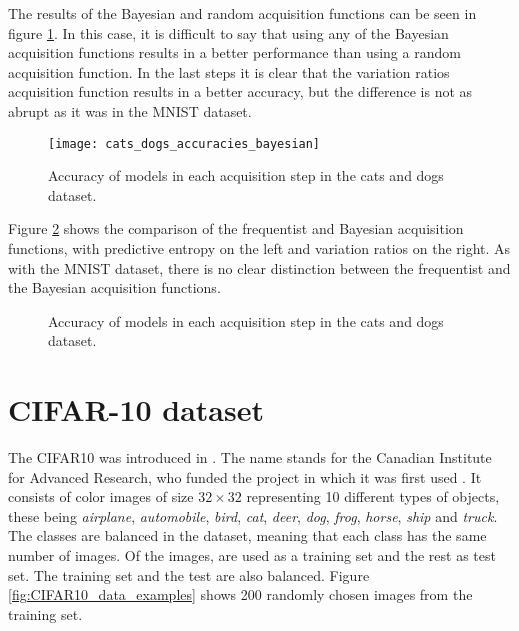 The results of the Bayesian and random acquisition functions can be seen in figure \ref{fig:cats_dogs_accuracies_bayesian}. In this case, it is difficult to say that using any of the Bayesian acquisition functions results in a better performance than using a random acquisition function. In the last steps it is clear that the variation ratios acquisition function results in a better accuracy, but the difference is not as abrupt as it was in the MNIST dataset.

\begin{figure}[H]
    \centering
    \texttt{[image: cats\_dogs\_accuracies\_bayesian]}
    \caption{Accuracy of models in each acquisition step in the cats and dogs dataset.}
    \label{fig:cats_dogs_accuracies_bayesian}
\end{figure}

Figure \ref{fig:cats_dogs_bayesian_vs_freq} shows the comparison of the frequentist and Bayesian acquisition functions, with predictive entropy on the left and variation ratios on the right. As with the MNIST dataset, there is no clear distinction between the frequentist and the Bayesian acquisition functions.

\begin{figure}[H]
    \centering
    \hfill
    \caption{Accuracy of models in each acquisition step in the cats and dogs dataset.}
    \label{fig:cats_dogs_bayesian_vs_freq}
\end{figure}




\section{CIFAR-10 dataset}

The CIFAR10 was introduced in \citeyear{krizhevsky2009learning}. The name stands for the Canadian Institute for Advanced Research, who funded the project in which it was first used \cite{krizhevsky2009learning}. It consists of  color images of size $32 \times 32$ representing 10 different types of objects, these being \textit{airplane}, \textit{automobile}, \textit{bird}, \textit{cat}, \textit{deer}, \textit{dog}, \textit{frog}, \textit{horse}, \textit{ship} and \textit{truck}. The classes are balanced in the dataset, meaning that each class has the same number of images. Of the  images,  are used as a training set and the rest as test set. The training set and the test are also balanced. Figure \ref{fig:CIFAR10_data_examples} shows 200 randomly chosen images from the training set.

